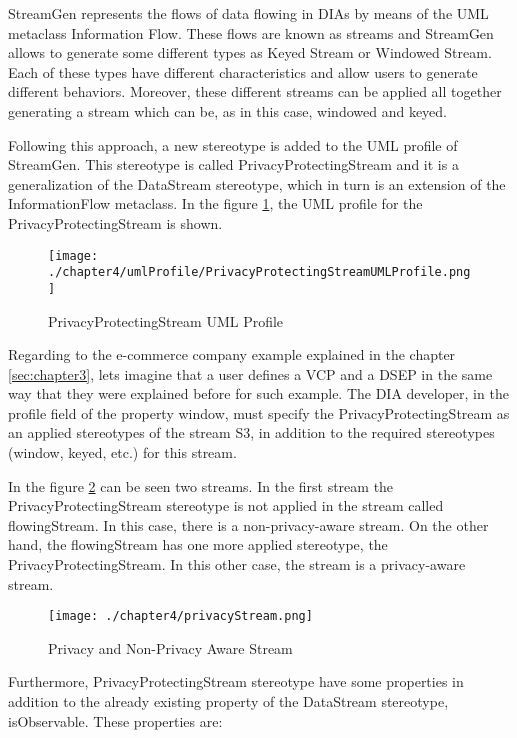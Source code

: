 StreamGen represents the flows of data flowing in DIAs by means of the UML metaclass Information Flow. These flows are known as streams and StreamGen allows to generate some different types as Keyed Stream or Windowed Stream. Each of these types have different characteristics and allow users to generate different behaviors. Moreover, these different streams can be applied all together generating a stream which can be, as in this case, windowed and keyed.

Following this approach, a new stereotype is added to the UML profile of StreamGen. This stereotype is called PrivacyProtectingStream and it is a generalization of the DataStream stereotype, which in turn is an extension of the InformationFlow metaclass. In the figure \ref{fig:PrivacyProtectingStream UML Profile}, the UML profile for the PrivacyProtectingStream is shown.

\begin{figure}
\centering
{\texttt{[image: ./chapter4/umlProfile/PrivacyProtectingStreamUMLProfile.png]}}
\caption{PrivacyProtectingStream UML Profile}
\label{fig:PrivacyProtectingStream UML Profile}
\end{figure}

Regarding to the e-commerce company example explained in the chapter \ref{sec:chapter3}, lets imagine that a user defines a VCP and a DSEP in the same way that they were explained before for such example. The DIA developer, in the profile field of the property window, must specify the PrivacyProtectingStream as an applied stereotypes of the stream S3, in addition to the required stereotypes (window, keyed, etc.) for this stream.

In the figure \ref{fig:Privacy and Non-Privacy Aware Stream} can be seen two streams. In the first stream the PrivacyProtectingStream stereotype is not applied in the stream called flowingStream. In this case, there is a non-privacy-aware stream. On the other hand, the flowingStream has one more applied stereotype, the PrivacyProtectingStream. In this other case, the stream is a privacy-aware stream.

\begin{figure}
\centering
{\texttt{[image: ./chapter4/privacyStream.png]}}
\caption{Privacy and Non-Privacy Aware Stream}
\label{fig:Privacy and Non-Privacy Aware Stream}
\end{figure}

Furthermore, PrivacyProtectingStream stereotype have some properties in addition to the already existing property of the DataStream stereotype, isObservable. These properties are:

